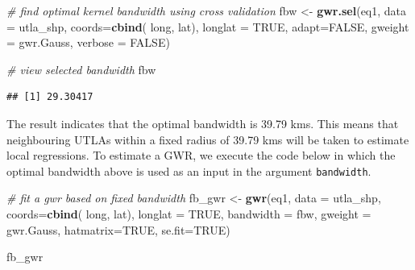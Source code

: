\documentclass[
]{book}
\newenvironment{Shaded}{\begin{snugshade}}{\end{snugshade}}
\newcommand{\CommentTok}[1]{\textcolor[rgb]{0.56,0.35,0.01}{\textit{#1}}}
\newcommand{\DataTypeTok}[1]{\textcolor[rgb]{0.13,0.29,0.53}{#1}}
\newcommand{\KeywordTok}[1]{\textcolor[rgb]{0.13,0.29,0.53}{\textbf{#1}}}
\newcommand{\NormalTok}[1]{#1}
\newcommand{\OtherTok}[1]{\textcolor[rgb]{0.56,0.35,0.01}{#1}}
\newcommand{\StringTok}[1]{\textcolor[rgb]{0.31,0.60,0.02}{#1}}
\begin{document}
\begin{Shaded}
\begin{Highlighting}[]
\CommentTok{# find optimal kernel bandwidth using cross validation}
\NormalTok{fbw <-}\StringTok{ }\KeywordTok{gwr.sel}\NormalTok{(eq1, }
               \DataTypeTok{data =}\NormalTok{ utla_shp, }
               \DataTypeTok{coords=}\KeywordTok{cbind}\NormalTok{( long, lat),}
               \DataTypeTok{longlat =} \OtherTok{TRUE}\NormalTok{,}
               \DataTypeTok{adapt=}\OtherTok{FALSE}\NormalTok{, }
               \DataTypeTok{gweight =}\NormalTok{ gwr.Gauss, }
               \DataTypeTok{verbose =} \OtherTok{FALSE}\NormalTok{)}

\CommentTok{# view selected bandwidth}
\NormalTok{fbw}
\end{Highlighting}
\end{Shaded}

\begin{verbatim}
## [1] 29.30417
\end{verbatim}

The result indicates that the optimal bandwidth is 39.79 kms. This means that neighbouring UTLAs within a fixed radius of 39.79 kms will be taken to estimate local regressions. To estimate a GWR, we execute the code below in which the optimal bandwidth above is used as an input in the argument \texttt{bandwidth}.

\begin{Shaded}
\begin{Highlighting}[]
\CommentTok{# fit a gwr based on fixed bandwidth}
\NormalTok{fb_gwr <-}\StringTok{ }\KeywordTok{gwr}\NormalTok{(eq1, }
            \DataTypeTok{data =}\NormalTok{ utla_shp,}
            \DataTypeTok{coords=}\KeywordTok{cbind}\NormalTok{( long, lat),}
            \DataTypeTok{longlat =} \OtherTok{TRUE}\NormalTok{,}
            \DataTypeTok{bandwidth =}\NormalTok{ fbw, }
            \DataTypeTok{gweight =}\NormalTok{ gwr.Gauss,}
            \DataTypeTok{hatmatrix=}\OtherTok{TRUE}\NormalTok{, }
            \DataTypeTok{se.fit=}\OtherTok{TRUE}\NormalTok{)}

\NormalTok{fb_gwr}
\end{Highlighting}
\end{Shaded}
\end{document}
